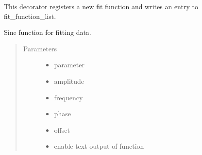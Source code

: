 \documentclass[letterpaper,10pt,english]{sphinxmanual}
\begin{document}

\begin{fulllineitems}
\label{\detokenize{fit-functions:fit_functions.register_fit_function}}
This decorator registers a new fit function and writes an entry to fit\_function\_list.

\end{fulllineitems}


\begin{fulllineitems}
\label{\detokenize{fit-functions:fit_functions.sine}}
Sine function for fitting data.
\begin{quote}\begin{description}
\item[{Parameters}] \leavevmode\begin{itemize}
\item {} 
 \textendash{} parameter

\item {} 
 \textendash{} amplitude

\item {} 
 \textendash{} frequency

\item {} 
 \textendash{} phase

\item {} 
 \textendash{} offset

\item {} 
 \textendash{} enable text output of function

\end{itemize}

\end{description}\end{quote}

\end{fulllineitems}
\end{document}
